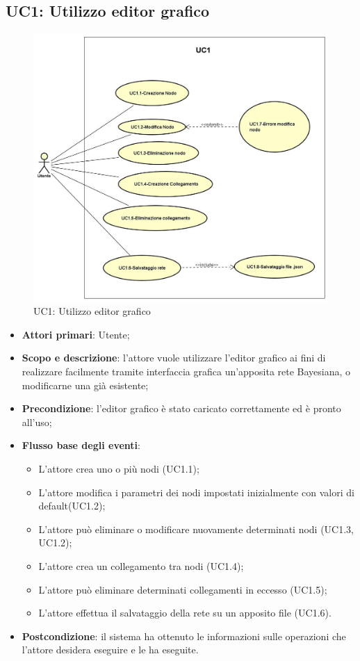 \subsection{UC1: Utilizzo editor grafico}
\hypertarget{UC1}{} 
\begin{figure} [H]
	\centering
	\includegraphics[scale=0.45]{Img/UC1} 
	\caption{UC1: Utilizzo editor grafico} \label{} 
\end{figure} 
\begin{itemize} 
	\item{\textbf{Attori primari}: Utente;}
	\item{\textbf{Scopo e descrizione}: l'attore vuole utilizzare l'editor grafico ai fini di realizzare facilmente tramite interfaccia grafica un'apposita rete Bayesiana, o modificarne una già esistente;} 
	\item{\textbf{Precondizione}: l'editor grafico è stato caricato correttamente ed è pronto all'uso;} 
	\item{\textbf{Flusso base degli eventi}: 
		\begin{itemize} 
			\item{L'attore crea uno o più nodi (UC1.1);} 
			\item{L'attore modifica i parametri dei nodi impostati inizialmente con valori di default(UC1.2);} 
			\item{L'attore può eliminare o modificare nuovamente determinati nodi (UC1.3, UC1.2)}; 
			\item{L'attore crea un collegamento tra nodi (UC1.4);} 
			\item{L'attore può eliminare determinati collegamenti in eccesso (UC1.5);} 
			\item{L'attore effettua il salvataggio della rete su un apposito file (UC1.6).} 
		\end{itemize} 
	} 
	\item{\textbf{Postcondizione}: il sistema ha ottenuto le informazioni sulle operazioni che l'attore desidera eseguire e le ha eseguite.} 
\end{itemize} 
